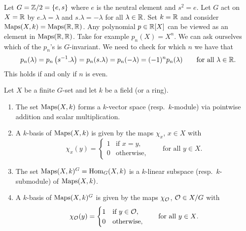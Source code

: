 \begin{expl}
  Let $G = \mathbb{Z}/2 = \{e,s\}$ where $e$ is the neutral element and $s^2 = e$.
  Let $G$ act on $X = \mathbb{R}$ by $e.\lambda = \lambda$ and $s.\lambda = -\lambda$ for all $\lambda \in \mathbb{R}$.
  Set $k = \mathbb{R}$ and consider $\operatorname{Maps}(X,k) = \operatorname{Maps}(\mathbb{R},\mathbb{R})$.
  Any polynomial $p \in \mathbb{R}[X]$ can be viewed as an element in $\operatorname{Maps}(\mathbb{R},\mathbb{R})$.
  Take for example $p_n(X) = X^n$.
  We can ask ourselves which of the $p_n$’s is $G$-invariant.
  We need to check for which $n$ we have that
  \[
      p_n(\lambda)
    = p_n\left( s^{-1}.\lambda \right)
    = p_n(s.\lambda)
    = p_n(-\lambda)
    = (-1)^n p_n(\lambda)
    \qquad
    \text{for all $\lambda \in \mathbb{R}$}.
  \]
  This holds if and only if $n$ is even.
\end{expl}


\begin{lem}\label{lem: basis of Maps and Hom}
  Let $X$ be a finite $G$-set and let $k$ be a field \textup(or a ring\textup).
  \begin{enumerate}[label=\alph*),leftmargin=*]
    \item
      The set $\operatorname{Maps}(X,k)$ forms a $k$-vector space \textup(resp.\ $k$-module\textup) via pointwise addition and scalar multiplication.
    \item
      A $k$-basis of $\operatorname{Maps}(X,k)$ is given by the maps $\chi_x$, $x \in X$ with
      \[
          \chi_x(y)
        = \begin{cases}
            1 & \text{if $x = y$}, \\
            0 & \text{otherwise},
          \end{cases}
        \qquad
        \text{for all $y \in X$}.
      \]
    \item
      \label{enum: invariants form a submodule}
      The set $\operatorname{Maps}(X,k)^G = \operatorname{Hom}_G(X,k)$ is a $k$-linear subspace \textup(resp.\ $k$-submodule\textup) of $\operatorname{Maps}(X,k)$.
    \item
      A $k$-basis of $\operatorname{Maps}(X,k)^G$ is given by the maps $\chi_\mathcal{O}$, $\mathcal{O} \in X/G$ with
      \[
          \chi_\mathcal{O}(y)
        = \begin{cases}
            1 & \text{if $y \in \mathcal{O}$}, \\
            0 & \text{otherwise},
          \end{cases}
        \qquad
        \text{for all $y \in X$}.
      \]
  \end{enumerate}
\end{lem}
